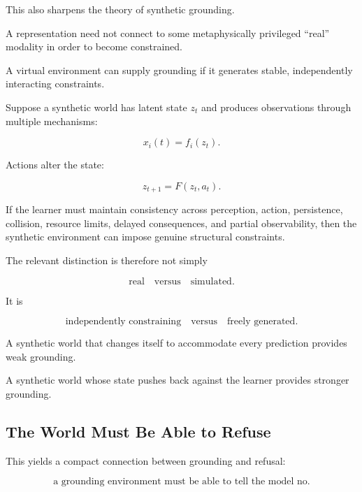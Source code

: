 \documentclass[11pt]{article}
\theoremstyle{remark}
\begin{document}
This also sharpens the theory of synthetic grounding.

A representation need not connect to some metaphysically privileged ``real'' modality in order to become constrained.

A virtual environment can supply grounding if it generates stable, independently interacting constraints.

Suppose a synthetic world has latent state $z_t$ and produces observations through multiple mechanisms:

\begin{equation}
x_i(t)=f_i(z_t).
\end{equation}

Actions alter the state:

\begin{equation}
z_{t+1}=F(z_t,a_t).
\end{equation}

If the learner must maintain consistency across perception, action, persistence, collision, resource limits, delayed consequences, and partial observability, then the synthetic environment can impose genuine structural constraints.

The relevant distinction is therefore not simply

\begin{equation}
\text{real}
\quad\text{versus}\quad
\text{simulated}.
\end{equation}

It is

\begin{equation}
\text{independently constraining}
\quad\text{versus}\quad
\text{freely generated}.
\end{equation}

A synthetic world that changes itself to accommodate every prediction provides weak grounding.

A synthetic world whose state pushes back against the learner provides stronger grounding.

\subsection{The World Must Be Able to Refuse}

This yields a compact connection between grounding and refusal:

\begin{equation}
\boxed{
\text{a grounding environment must be able to tell the model no}.
}
\end{equation}
\end{document}
